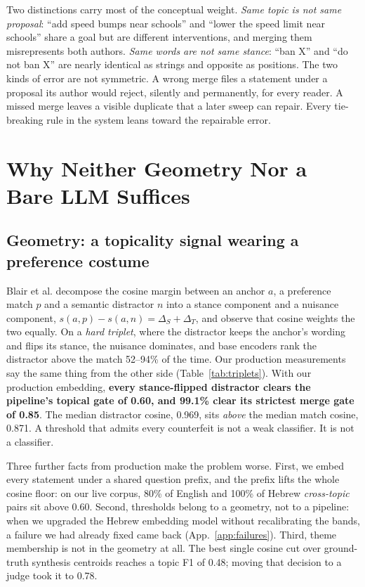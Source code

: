 \documentclass{article}
\newcommand{\bpt}{Blair et al.\xspace}
\newcommand{\hl}[1]{\textbf{#1}}
\begin{document}
Two distinctions carry most of the conceptual weight. \emph{Same topic is not same proposal}: ``add speed bumps near schools'' and ``lower the speed limit near schools'' share a goal but are different interventions, and merging them misrepresents both authors. \emph{Same words are not same stance}: ``ban X'' and ``do not ban X'' are nearly identical as strings and opposite as positions. The two kinds of error are not symmetric. A wrong merge files a statement under a proposal its author would reject, silently and permanently, for every reader. A missed merge leaves a visible duplicate that a later sweep can repair. Every tie-breaking rule in the system leans toward the repairable error.

\section{Why Neither Geometry Nor a Bare LLM Suffices}
\label{sec:why}

\subsection{Geometry: a topicality signal wearing a preference costume}
\label{sec:whynotgeom}

\bpt decompose the cosine margin between an anchor $a$, a preference match $p$ and a semantic distractor $n$ into a stance component and a nuisance component, $s(a,p)-s(a,n)=\Delta_S+\Delta_T$, and observe that cosine weights the two equally. On a \emph{hard triplet}, where the distractor keeps the anchor's wording and flips its stance, the nuisance dominates, and base encoders rank the distractor above the match 52--94\% of the time. Our production measurements say the same thing from the other side (Table~\ref{tab:triplets}). With our production embedding, \hl{every stance-flipped distractor clears the pipeline's topical gate of 0.60, and 99.1\% clear its strictest merge gate of 0.85}. The median distractor cosine, 0.969, sits \emph{above} the median match cosine, 0.871. A threshold that admits every counterfeit is not a weak classifier. It is not a classifier.

Three further facts from production make the problem worse. First, we embed every statement under a shared question prefix, and the prefix lifts the whole cosine floor: on our live corpus, 80\% of English and 100\% of Hebrew \emph{cross-topic} pairs sit above 0.60. Second, thresholds belong to a geometry, not to a pipeline: when we upgraded the Hebrew embedding model without recalibrating the bands, a failure we had already fixed came back (App.~\ref{app:failures}). Third, theme membership is not in the geometry at all. The best single cosine cut over ground-truth synthesis centroids reaches a topic F1 of 0.48; moving that decision to a judge took it to 0.78.
\end{document}

